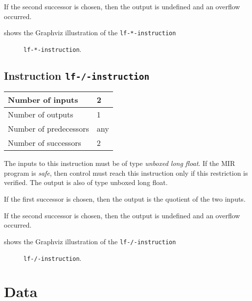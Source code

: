 If the second successor is chosen, then the output is undefined and an
overflow occurred. 

 shows the Graphviz illustration of the
\texttt{lf-*-instruction}

\begin{figure}
\begin{center}
\end{center}
\caption{\label{fig-lf-*-instruction}
\texttt{lf-*-instruction}.}
\end{figure}

\subsection{Instruction \texttt{lf-/-instruction}}
\label{mir-instruction-lf-/}

\begin{tabular}{|l|l|}
\hline
Number of inputs & 2\\
\hline
Number of outputs & 1\\
\hline
Number of predecessors & any\\
\hline
Number of successors & 2\\
\hline
\end{tabular}

The inputs to this instruction must be of type \emph{unboxed long
  float}.  If the MIR program is \emph{safe}, then control must reach
this instruction only if this restriction is verified.  The output is
also of type unboxed long float.

If the first successor is chosen, then the output is
the quotient of the two inputs.  

If the second successor is chosen, then the output is undefined and an
overflow occurred. 

 shows the Graphviz illustration of the
\texttt{lf-/-instruction}

\begin{figure}
\begin{center}
\end{center}
\caption{\label{fig-lf-/-instruction}
\texttt{lf-/-instruction}.}
\end{figure}

\section{Data}

